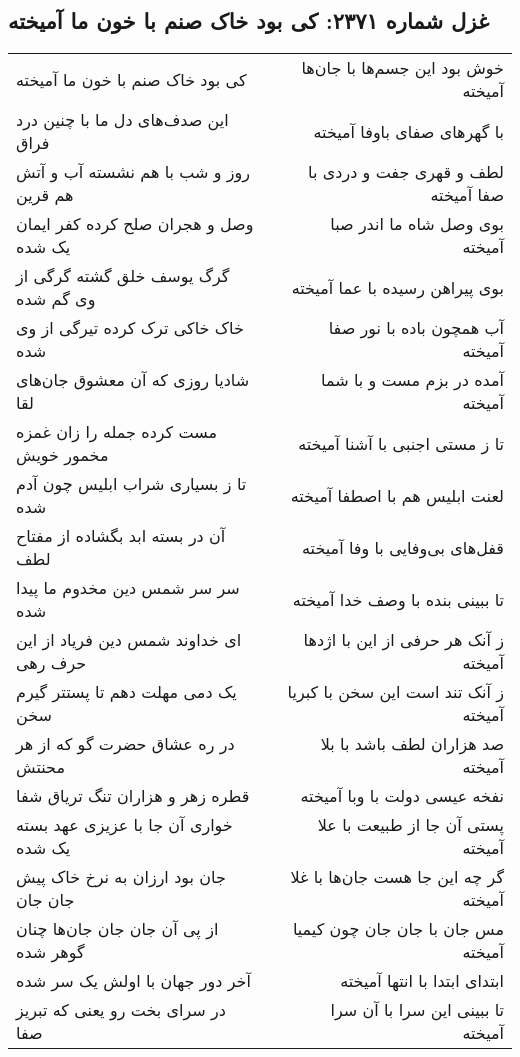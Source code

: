 \begin{center}
\section*{غزل شماره ۲۳۷۱: کی بود خاک صنم با خون ما آمیخته}
\label{sec:2371}
\begin{longtable}{l p{0.5cm} r}
کی بود خاک صنم با خون ما آمیخته
&&
خوش بود این جسم‌ها با جان‌ها آمیخته
\\
این صدف‌های دل ما با چنین درد فراق
&&
با گهرهای صفای باوفا آمیخته
\\
روز و شب با هم نشسته آب و آتش هم قرین
&&
لطف و قهری جفت و دردی با صفا آمیخته
\\
وصل و هجران صلح کرده کفر ایمان یک شده
&&
بوی وصل شاه ما اندر صبا آمیخته
\\
گرگ یوسف خلق گشته گرگی از وی گم شده
&&
بوی پیراهن رسیده با عما آمیخته
\\
خاک خاکی ترک کرده تیرگی از وی شده
&&
آب همچون باده با نور صفا آمیخته
\\
شادیا روزی که آن معشوق جان‌های لقا
&&
آمده در بزم مست و با شما آمیخته
\\
مست کرده جمله را زان غمزه مخمور خویش
&&
تا ز مستی اجنبی با آشنا آمیخته
\\
تا ز بسیاری شراب ابلیس چون آدم شده
&&
لعنت ابلیس هم با اصطفا آمیخته
\\
آن در بسته ابد بگشاده از مفتاح لطف
&&
قفل‌های بی‌وفایی با وفا آمیخته
\\
سر سر شمس دین مخدوم ما پیدا شده
&&
تا ببینی بنده با وصف خدا آمیخته
\\
ای خداوند شمس دین فریاد از این حرف رهی
&&
ز آنک هر حرفی از این با اژدها آمیخته
\\
یک دمی مهلت دهم تا پستتر گیرم سخن
&&
ز آنک تند است این سخن با کبریا آمیخته
\\
در ره عشاق حضرت گو که از هر محنتش
&&
صد هزاران لطف باشد با بلا آمیخته
\\
قطره زهر و هزاران تنگ تریاق شفا
&&
نفخه عیسی دولت با وبا آمیخته
\\
خواری آن جا با عزیزی عهد بسته یک شده
&&
پستی آن جا از طبیعت با علا آمیخته
\\
جان بود ارزان به نرخ خاک پیش جان جان
&&
گر چه این جا هست جان‌ها با غلا آمیخته
\\
از پی آن جان جان جان‌ها چنان گوهر شده
&&
مس جان با جان جان چون کیمیا آمیخته
\\
آخر دور جهان با اولش یک سر شده
&&
ابتدای ابتدا با انتها آمیخته
\\
در سرای بخت رو یعنی که تبریز صفا
&&
تا ببینی این سرا با آن سرا آمیخته
\\
\end{longtable}
\end{center}
